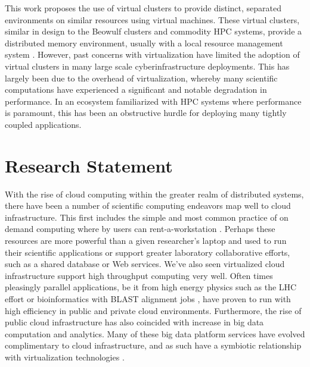 This work proposes the use of virtual clusters \cite{Foster2006} to provide distinct, separated environments on similar resources using virtual machines. These virtual clusters, similar in design to the Beowulf clusters and commodity HPC systems, provide a distributed memory environment, usually with a local resource management system \cite{czajkowski1998resource}.  However, past concerns with virtualization have limited the adoption of virtual clusters in many large scale cyberinfrastructure deployments. This has largely been due to the overhead of virtualization, whereby many scientific computations have experienced a significant and notable degradation in performance.  In an ecosystem familiarized with HPC systems where performance is paramount, this has been an obstructive hurdle for deploying many tightly coupled applications. 


\section{Research Statement}
\label{sec:stmt}


With the rise of cloud computing within the greater realm of distributed systems, there have been a number of scientific computing endeavors map well to cloud infrastructure. This first includes the simple and most common practice of on demand computing where by users can rent-a-workstation \cite{kondo2009cost}. Perhaps these resources are more powerful than a given researcher's laptop and used to run their scientific applications or support greater laboratory collaborative efforts, such as a shared database or Web services.  We've also seen virtualized cloud infrastructure support high throughput computing very well. Often times pleasingly parallel applications, be it from high energy physics such as the LHC effort \cite{buncic2010cernvm, bell2015scaling} or bioinformatics with BLAST alignment jobs \cite{menon2012cloud}, have proven to run with high efficiency in public and private cloud environments. Furthermore, the rise of public cloud infrastructure has also coincided with increase in big data computation and analytics.  Many of these big data platform services have evolved complimentary to cloud infrastructure, and as such have a symbiotic relationship with virtualization technologies \cite{gunarathne2010mapreduce}.  

